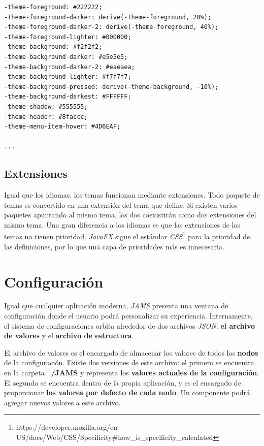 \begin{lstlisting}[frame=single,label={lst:global.css}]
-theme-foreground: #222222;
-theme-foreground-darker: derive(-theme-foreground, 20%);
-theme-foreground-darker-2: derive(-theme-foreground, 40%);
-theme-foreground-lighter: #000000;
-theme-background: #f2f2f2;
-theme-background-darker: #e5e5e5;
-theme-background-darker-2: #eaeaea;
-theme-background-lighter: #f7f7f7;
-theme-background-pressed: derive(-theme-background, -10%);
-theme-background-darkest: #FFFFFF;
-theme-shadow: #555555;
-theme-header: #8faccc;
-theme-menu-item-hover: #4D6EAF;

...
\end{lstlisting}

\subsection{Extensiones}\label{subsec:temas-extensiones}

Igual que los idiomas, los temas funcionan mediante extensiones.
Todo paquete de temas es convertido en una extensión del tema que define.
Si existen varios paquetes apuntando al mismo tema, los dos coexistirán
como dos extensiones del mismo tema.
Una gran diferencia a los idiomas es que las extensiones de los temas
no tienen prioridad.
\textit{JavaFX} sigue el estándar
\textit{CSS}\footnote{https://developer.mozilla.org/en-US/docs/Web/CSS/Specificity#how_is_specificity_calculated}
para la prioridad de las definiciones,
por lo que una capa de prioridades más es innecesaria.


\section{Configuración}\label{sec:configuracion}

Igual que cualquier aplicación moderna, \textit{JAMS} presenta una
ventana de configuración donde el usuario podrá personalizar su experiencia.
Internamente, el sistema de configuraciones orbita alrededor de dos archivos \textit{JSON}:
\textbf{el archivo de valores} y el \textbf{archivo de estructura}.

\noindent El archivo de valores es el encargado de almacenar los valores de
todos los \textbf{nodos} de la configuración.
Existe dos versiones de este archivo:
el primero se encuentra en la carpeta \textbf{~/JAMS} y representa los \textbf{valores
actuales de la configuración}.
El segundo se encuentra dentro de la propia aplicación, y es el encargado de
proporcionar \textbf{los valores por defecto de cada nodo}.
Un componente podrá agregar nuevos valores a este archivo.

